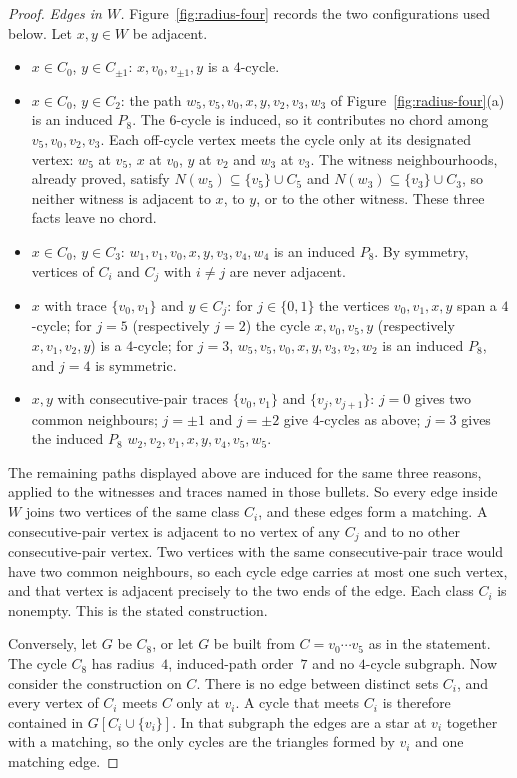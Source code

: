 \documentclass[ASNA]{USG}
\theoremstyle{WBstyletwo}
\numberwithin{equation}{section}
\begin{document}
\begin{proof}
\emph{Edges in $W$.} Figure~\ref{fig:radius-four} records the two configurations used below. Let $x,y\in W$ be adjacent.
\begin{itemize}
\item $x\in C_0$, $y\in C_{\pm 1}$: $x,v_0,v_{\pm 1},y$ is a $4$-cycle.
\item $x\in C_0$, $y\in C_2$: the path $w_5,v_5,v_0,x,y,v_2,v_3,w_3$ of Figure~\ref{fig:radius-four}(a) is an induced $P_8$. The $6$-cycle is induced, so it contributes no chord among $v_5,v_0,v_2,v_3$. Each off-cycle vertex meets the cycle only at its designated vertex: $w_5$ at $v_5$, $x$ at $v_0$, $y$ at $v_2$ and $w_3$ at $v_3$. The witness neighbourhoods, already proved, satisfy $N(w_5)\subseteq\{v_5\}\cup C_5$ and $N(w_3)\subseteq\{v_3\}\cup C_3$, so neither witness is adjacent to $x$, to $y$, or to the other witness. These three facts leave no chord.
\item $x\in C_0$, $y\in C_3$: $w_1,v_1,v_0,x,y,v_3,v_4,w_4$ is an induced $P_8$. By symmetry, vertices of $C_i$ and $C_j$ with $i\ne j$ are never adjacent.
\item $x$ with trace $\{v_0,v_1\}$ and $y\in C_j$: for $j\in\{0,1\}$ the vertices $v_0,v_1,x,y$ span a $4$-cycle; for $j=5$ (respectively $j=2$) the cycle $x,v_0,v_5,y$ (respectively $x,v_1,v_2,y$) is a $4$-cycle; for $j=3$, $w_5,v_5,v_0,x,y,v_3,v_2,w_2$ is an induced $P_8$, and $j=4$ is symmetric.
\item $x,y$ with consecutive-pair traces $\{v_0,v_1\}$ and $\{v_j,v_{j+1}\}$: $j=0$ gives two common neighbours; $j=\pm 1$ and $j=\pm 2$ give $4$-cycles as above; $j=3$ gives the induced $P_8$ $w_2,v_2,v_1,x,y,v_4,v_5,w_5$.
\end{itemize}
The remaining paths displayed above are induced for the same three reasons, applied to the witnesses and traces named in those bullets. So every edge inside $W$ joins two vertices of the same class $C_i$, and these edges form a matching. A consecutive-pair vertex is adjacent to no vertex of any $C_j$ and to no other consecutive-pair vertex. Two vertices with the same consecutive-pair trace would have two common neighbours, so each cycle edge carries at most one such vertex, and that vertex is adjacent precisely to the two ends of the edge. Each class $C_i$ is nonempty. This is the stated construction.

Conversely, let $G$ be $C_8$, or let $G$ be built from $C=v_0\cdots v_5$ as in the statement. The cycle $C_8$ has radius~$4$, induced-path order~$7$ and no $4$-cycle subgraph. Now consider the construction on $C$. There is no edge between distinct sets $C_i$, and every vertex of $C_i$ meets $C$ only at $v_i$. A cycle that meets $C_i$ is therefore contained in $G[C_i\cup\{v_i\}]$. In that subgraph the edges are a star at $v_i$ together with a matching, so the only cycles are the triangles formed by $v_i$ and one matching edge.


\end{proof}
\end{document}

